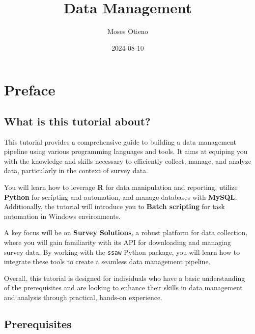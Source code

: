 \documentclass[
  letterpaper,
  DIV=11,
  numbers=noendperiod]{scrreprt}
\title{Data Management}
\author{Moses Otieno}
\date{2024-08-10}
\renewcommand*\contentsname{Table of contents}
\newcommand\contentsname{Table of contents}
\begin{document}
\maketitle

\renewcommand*\contentsname{Table of contents}
{
\hypersetup{linkcolor=}
\setcounter{tocdepth}{2}
\tableofcontents
}


\chapter*{Preface}\label{preface}


\section*{What is this tutorial
about?}\label{what-is-this-tutorial-about}


This tutorial provides a comprehensive guide to building a data
management pipeline using various programming languages and tools. It
aims at equiping you with the knowledge and skills necessary to
efficiently collect, manage, and analyze data, particularly in the
context of survey data.

You will learn how to leverage \textbf{R} for data manipulation and
reporting, utilize \textbf{Python} for scripting and automation, and
manage databases with \textbf{MySQL}. Additionally, the tutorial will
introduce you to \textbf{Batch scripting} for task automation in Windows
environments.

A key focus will be on \textbf{Survey Solutions}, a robust platform for
data collection, where you will gain familiarity with its API for
downloading and managing survey data. By working with the \texttt{ssaw}
Python package, you will learn how to integrate these tools to create a
seamless data management pipeline.

Overall, this tutorial is designed for individuals who have a basic
understanding of the prerequisites and are looking to enhance their
skills in data management and analysis through practical, hands-on
experience.

\section*{Prerequisites}\label{prerequisites}
\end{document}
